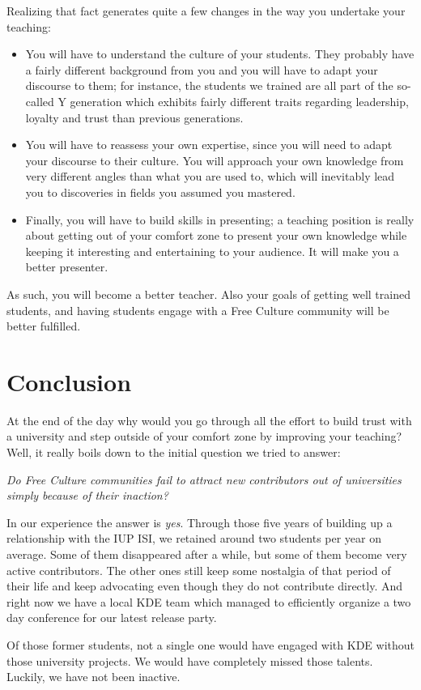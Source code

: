 Realizing that fact generates quite a few changes in the way you undertake
your teaching:
\begin{itemize}
  \item You will have to understand the culture of your students. They probably
have a fairly different background from you and you will have to adapt your
discourse to them; for instance, the students we trained are all part of the so-called Y generation which exhibits fairly different traits regarding leadership, loyalty and trust than previous generations.
  \item You will have to reassess your own expertise, since you will need to
adapt your discourse to their culture. You will approach your own knowledge from
very different angles than what you are used to, which will inevitably lead you
to discoveries in fields you assumed you mastered.
  \item Finally, you will have to build skills in presenting; a teaching
position is really about getting out of your comfort zone to present your own
knowledge while keeping it interesting and entertaining to your audience. It
will make you a better presenter.
\end{itemize}

As such, you will become a better teacher. Also your goals of getting well
trained students, and having students engage with a Free Culture community will
be better fulfilled.

\section*{Conclusion}
At the end of the day why would you go through all the effort
to build trust with a university and step outside of your comfort zone by
improving your teaching? Well, it really boils down to the initial question we
tried to answer:

\emph{Do Free Culture communities fail to attract new contributors out of
universities simply because of their inaction?}

In our experience the answer is \emph{yes}. Through those five years of building
up a relationship with the IUP ISI, we retained around two students per year on
average. Some of them disappeared after a while, but some of them become very
active contributors. The other ones still keep some nostalgia of that period of
their life and keep advocating even though they do not contribute directly. And
right now we have a local KDE team which managed to efficiently organize a two
day conference for our latest release party.

Of those former students, not a single one would have engaged with KDE without
those university projects. We would have completely missed those talents.
Luckily, we have not been inactive.
